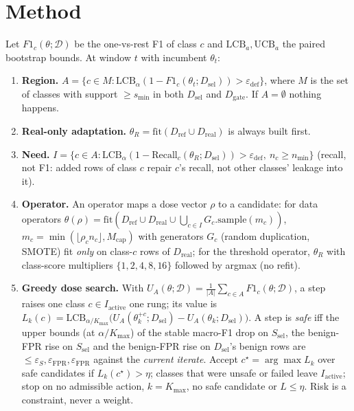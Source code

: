 \documentclass[conference]{IEEEtran}
\newcommand{\thR}{\theta_{R}}
\newcommand{\eps}{\varepsilon}
\begin{document}
\section{Method}\label{sec:method}
Let $F1_c(\theta;\mathcal D)$ be the one-vs-rest F1 of class $c$ and $\mathrm{LCB}_a,\mathrm{UCB}_a$ the paired bootstrap bounds. At window $t$ with incumbent $\theta_t$:
\begin{enumerate}
\item \textbf{Region.} $A=\{c\in M : \mathrm{LCB}_\alpha(1-F1_c(\theta_t;D_{\mathrm{sel}}))>\eps_{\mathrm{def}}\}$, where $M$ is the set of classes with support $\ge s_{\min}$ in both $D_{\mathrm{sel}}$ and $D_{\mathrm{gate}}$. If $A=\emptyset$ nothing happens.
\item \textbf{Real-only adaptation.} $\thR=\mathrm{fit}(D_{\mathrm{ref}}\cup D_{\mathrm{real}})$ is always built first.
\item \textbf{Need.} $I=\{c\in A:\mathrm{LCB}_\alpha(1-\mathrm{Recall}_c(\thR;D_{\mathrm{sel}}))>\eps_{\mathrm{def}},\ n_c\ge n_{\min}\}$ (recall, not F1: added rows of class $c$ repair $c$'s recall, not other classes' leakage into it).
\item \textbf{Operator.} An operator maps a dose vector $\rho$ to a candidate: for data operators
$\theta(\rho)=\mathrm{fit}(D_{\mathrm{ref}}\cup D_{\mathrm{real}}\cup\bigcup_{c\in I}G_c.\mathrm{sample}(m_c))$, $m_c=\min(\lfloor\rho_c n_c\rfloor,M_{\mathrm{cap}})$ with generators $G_c$ (random duplication, SMOTE) fit \emph{only} on class-$c$ rows of $D_{\mathrm{real}}$; for the threshold operator, $\thR$ with class-score multipliers $\{1,2,4,8,16\}$ followed by argmax (no refit).
\item \textbf{Greedy dose search.} With $U_A(\theta;\mathcal D)=\frac1{|A|}\sum_{c\in A}F1_c(\theta;\mathcal D)$, a step raises one class $c\in I_{\mathrm{active}}$ one rung; its value is
$L_k(c)=\mathrm{LCB}_{\alpha/K_{\max}}\!\big(U_A(\theta_k^{+c};D_{\mathrm{sel}})-U_A(\theta_k;D_{\mathrm{sel}})\big)$. A step is \emph{safe} iff the upper bounds (at $\alpha/K_{\max}$) of the stable macro-F1 drop on $S_{\mathrm{sel}}$, the benign-FPR rise on $S_{\mathrm{sel}}$ and the benign-FPR rise on $D_{\mathrm{sel}}$'s benign rows are $\le\eps_S,\eps_{\mathrm{FPR}},\eps_{\mathrm{FPR}}$ against the \emph{current iterate}. Accept $c^\star=\arg\max L_k$ over safe candidates if $L_k(c^\star)>\eta$; classes that were unsafe or failed leave $I_{\mathrm{active}}$; stop on no admissible action, $k=K_{\max}$, no safe candidate or $L\le\eta$. Risk is a constraint, never a weight.

\end{enumerate}
\end{document}
